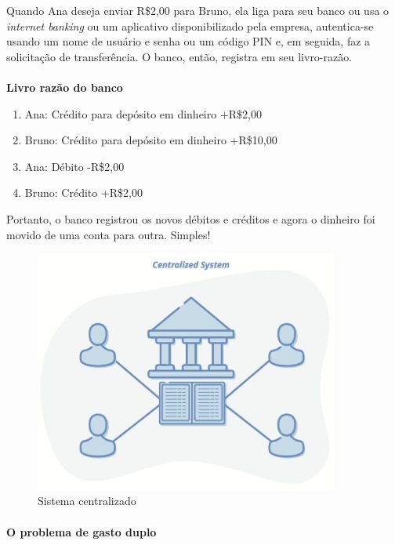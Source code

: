 Quando Ana deseja enviar R\$2,00 para Bruno, ela liga para seu banco ou usa o \textit{internet banking} ou um aplicativo disponibilizado pela empresa, autentica-se usando um nome de usuário e senha ou um código PIN e, em seguida, faz a solicitação de transferência. O banco, então, registra em seu livro-razão.

\paragraph{}
\textbf{Livro razão do banco}

\begin{samepage}
\begin{enumerate}
\item Ana: Crédito para depósito em dinheiro +R\$2,00
\item Bruno: Crédito para depósito em dinheiro +R\$10,00
\item Ana: Débito -R\$2,00
\item Bruno: Crédito +R\$2,00
\end{enumerate}
\end{samepage}

Portanto, o banco registrou os novos débitos e créditos e agora o dinheiro foi movido de uma conta para outra. Simples!
\newpage
\begin{figure}
  \centering
  \includegraphics[width=10cm]{imagens/centralizado-capitulo-02.jpg}
  \caption{Sistema centralizado}
\end{figure}


\paragraph{O problema de gasto duplo}
\paragraph{}

